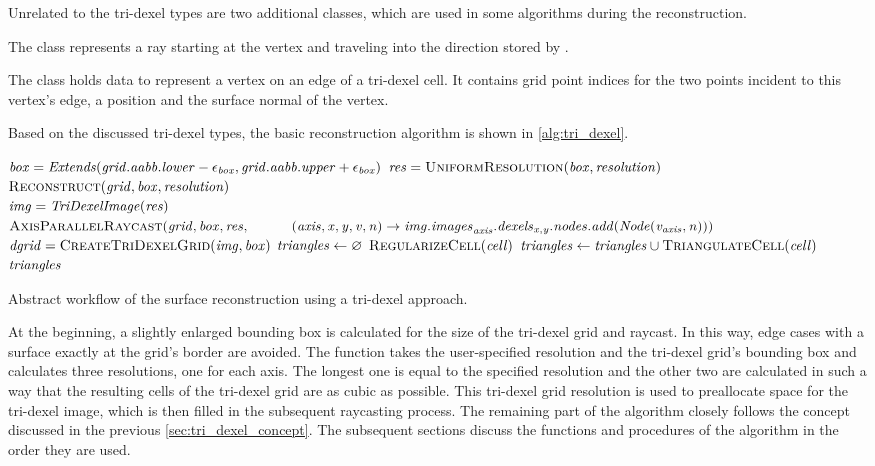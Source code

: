 Unrelated to the tri-dexel types are two additional classes, which are used in some algorithms during the reconstruction.

The  class represents a ray starting at the vertex  and traveling into the direction stored by .

The  class holds data to represent a vertex on an edge of a tri-dexel cell.
It contains grid point indices for the two points incident to this vertex's edge, a position and the surface normal of the vertex.

Based on the discussed tri-dexel types, the basic reconstruction algorithm is shown in \cref{alg:tri_dexel}.
%
\begin{algorithm}
	\centering
	\begin{algorithmic}[1]
			\State $\mathit{box} = \mathit{Extends}(\mathit{grid}.\mathit{aabb}.\mathit{lower} - \epsilon_{\mathit{box}}, \mathit{grid}.\mathit{aabb}.\mathit{upper} + \epsilon_{\mathit{box}})$
			\State $\var{res} = \Call{UniformResolution}{\var{box}, \var{resolution}}$
			\State $\Call{Reconstruct}{\var{grid}, \var{box}, \var{resolution}}$
		\EndFunction
		\\
			\State $\mathit{img} = \mathit{TriDexelImage}(\mathit{res})$ \label{line:tri_dexel_begin}
			\State $\Call{AxisParallelRaycast}{\var{grid}, \var{box}, \var{res},\hfill\break
				\hspace*{\dimexpr\algorithmicindent*2}(\var{axis}, \var{x}, \var{y}, \var{v}, \var{n}) \rightarrow \var{img}.\var{images}_{\var{axis}}.\var{dexels}_{\var{x}, \var{y}}.\var{nodes}.\var{add}(\var{Node}(\var{v}_{\var{axis}}, \var{n}))}$
			\State $\var{dgrid} = \Call{CreateTriDexelGrid}{\var{img}, \var{box}}$
			\State $\mathit{triangles} \gets \varnothing$
				\State $\Call{RegularizeCell}{\var{cell}}$
				\State $\var{triangles} \gets \var{triangles} \cup \Call{TriangulateCell}{\var{cell}}$
			\EndFor
			\State \Return $\mathit{triangles}$
		\EndFunction
	\end{algorithmic}
	\caption{
		Abstract workflow of the surface reconstruction using a tri-dexel approach.
	}
	\label{alg:tri_dexel}
\end{algorithm}
%
At the beginning, a slightly enlarged bounding box is calculated for the size of the tri-dexel grid and raycast.
In this way, edge cases with a surface exactly at the grid's border are avoided.
The  function takes the user-specified resolution and the tri-dexel grid's bounding box and calculates three resolutions, one for each axis.
The longest one is equal to the specified resolution and the other two are calculated in such a way that the resulting cells of the tri-dexel grid are as cubic as possible.
This tri-dexel grid resolution is used to preallocate space for the tri-dexel image, which is then filled in the subsequent raycasting process.
The remaining part of the algorithm closely follows the concept discussed in the previous \cref{sec:tri_dexel_concept}.
The subsequent sections discuss the functions and procedures of the algorithm in the order they are used.


